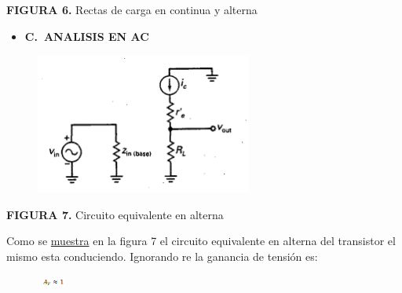 \documentclass[12pt]{article}
\begin{document}

\par

\textbf{FIGURA 6.} Rectas de carga en continua y alterna\par

\begin{itemize}
	\item \textbf{C. ANALISIS EN AC}
\end{itemize}\par




\begin{figure}[H]
	\begin{Center}
		\includegraphics[width=2.81in,height=1.82in]{./media/image10.gif}
	\end{Center}
\end{figure}



\par

\textbf{FIGURA 7.} Circuito equivalente en alterna\par

Como se \href{https://www.monografias.com/trabajos11/tebas/tebas.shtml}{muestra} en la figura 7 el circuito equivalente en alterna del transistor el mismo esta conduciendo. Ignorando re la ganancia de tensión es:\par




\begin{figure}[H]
	\begin{Center}
		\includegraphics[width=0.42in,height=0.12in]{./media/image11.gif}
	\end{Center}
\end{figure}
\end{document}
